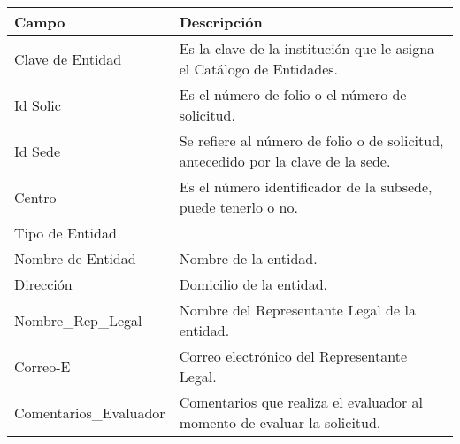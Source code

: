 \begin{tabular}{ m{} m{}  }%
	\rowcolor{gray1} {\bf Campo} &  {\bf Descripción} \\ \hline \hline

	Clave de Entidad & Es la clave de la institución que le asigna el Catálogo de Entidades.\\
	\rowcolor{gray1}Id Solic & Es el número de folio o el número de solicitud.\\
	Id Sede & Se refiere al número de folio o de solicitud, antecedido por la clave de la sede.\\
	\rowcolor{gray1}Centro & Es el número identificador de la subsede, puede tenerlo o no.\\
	Tipo de Entidad & \\
	\rowcolor{gray1}Nombre de Entidad & Nombre de la entidad.\\
	Dirección & Domicilio de la entidad.\\
	\rowcolor{gray1}Nombre\_Rep\_Legal & Nombre del Representante Legal de la entidad.\\
	Correo-E & Correo electrónico del Representante Legal.\\
	\rowcolor{gray1}Comentarios\_Evaluador & Comentarios que realiza el evaluador al momento de evaluar la solicitud.\\
    \end{tabular}

